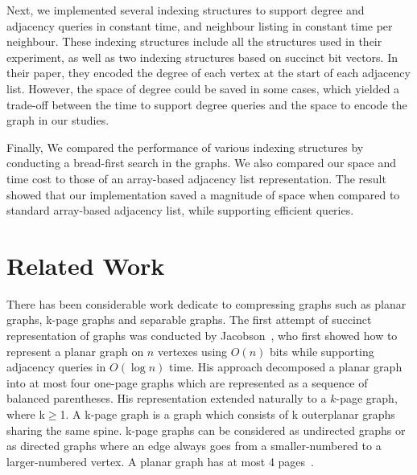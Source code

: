 \documentclass[12pt,glossary]{dalthesis}
\begin{document}
\bigskip
\bigskip

Next, we implemented several indexing structures to support degree and adjacency queries in constant time, and neighbour listing in constant time per neighbour. These indexing structures include all the structures used in their experiment, as well as two indexing structures based on succinct bit vectors. In their paper, they encoded the degree of each vertex at the start of each adjacency list. However, the space of degree could be saved in some cases, which yielded a trade-off between the time to support degree queries and the space to encode the graph in our studies.

\bigskip
\bigskip

Finally, We compared the performance of various indexing structures by conducting a bread-first search in the graphs. We also compared our space and time cost to those of an array-based adjacency list representation. The result showed that our implementation saved a magnitude of space when compared to standard array-based adjacency list, while supporting efficient queries.   

\section{Related Work}

There has been considerable work dedicate to compressing graphs such as planar graphs, k-page graphs and separable graphs. The first attempt of succinct representation of graphs was conducted by Jacobson~\cite{Jacobson}, who first showed how to represent a planar graph on $n$ vertexes using $O(n)$ bits while supporting adjacency queries in $O(\log n)$ time. His approach decomposed a planar graph into at most four one-page graphs which are represented as a sequence of balanced parentheses. His representation extended naturally to a $k$-page graph, where k$\geq$1. A k-page graph is a graph which consists of k outerplanar graphs sharing the same spine. k-page graphs can be considered as undirected graphs or as directed graphs where an edge always goes from a smaller-numbered to a larger-numbered vertex. A planar graph has at most 4 pages~\cite{k-page-def}. 

\bigskip
\bigskip
\end{document}
